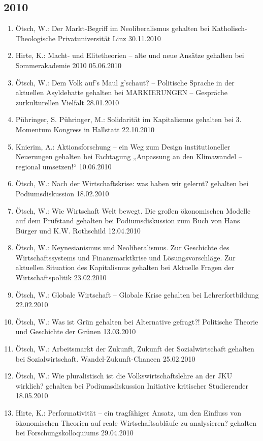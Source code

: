 \subsection*{2010}
\begin{enumerate}
	\item Ötsch, W.: Der Markt-Begriff im Neoliberalismus gehalten bei Katholisch-Theologische Privatuniversität Linz 30.11.2010
	\item Hirte, K.: Macht- und Elitetheorien – alte und neue Ansätze gehalten bei Sommerakademie 2010 05.06.2010
	\item Ötsch, W.: Dem Volk auf's Maul g'schaut? -- Politische Sprache in der aktuellen Asyldebatte gehalten bei \glqq MARKIERUNGEN -- Gespräche zurkulturellen Vielfalt\grqq{} 28.01.2010
	\item Pühringer, S. Pühringer, M.: Solidarität im Kapitalismus gehalten bei 3. Momentum Kongress in Hallstatt 22.10.2010
	\item  Knierim, A.: Aktionsforschung – ein Weg zum Design institutioneller Neuerungen gehalten bei Fachtagung „Anpassung an den Klimawandel – regional umsetzen!“ 10.06.2010
	\item Ötsch, W.: Nach der Wirtschaftskrise: was haben wir gelernt? gehalten bei Podiumsdiskussion 18.02.2010
	\item Ötsch, W.: Wie Wirtschaft Welt bewegt. Die großen ökonomischen Modelle auf dem Prüfstand gehalten bei Podiumsdiskussion zum Buch von Hans Bürger und K.W. Rothschild 12.04.2010
	\item Ötsch, W.: Keynesianismus und Neoliberalismus. Zur Geschichte des Wirtschaftssystems und Finanzmarktkrise und Lösungsvorschläge. Zur aktuellen Situation des Kapitalismus gehalten bei Aktuelle Fragen der Wirtschaftspolitik 23.02.2010
	\item Ötsch, W.: Globale Wirtschaft -- Globale Krise gehalten bei Lehrerfortbildung 22.02.2010
	\item Ötsch, W.: Was ist Grün gehalten bei Alternative gefragt?! Politische Theorie und Geschichte der Grünen 13.03.2010
	\item Ötsch, W.: Arbeitsmarkt der Zukunft, Zukunft der Sozialwirtschaft gehalten bei Sozialwirtschaft. Wandel-Zukunft-Chancen 25.02.2010
	\item Ötsch, W.: Wie pluralistisch ist die Volkswirtschaftslehre an der JKU wirklich? gehalten bei Podiumsdiskussion Initiative kritischer Studierender 18.05.2010
	\item Hirte, K.: Performativität -- ein tragfähiger Ansatz, um den Einfluss von ökonomischen Theorien auf reale Wirtschaftsabläufe zu analysieren? gehalten bei Forschungskolloquiums 29.04.2010

\end{enumerate}
